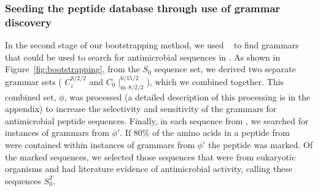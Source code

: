         \subsubsection{Seeding the peptide
            database through use of grammar
            discovery} In the second stage
            of our bootstrapping method,
            we used \Teiresias~ to find
            grammars that could be used
            to search for antimicrobial
            sequences in \sptr.  As shown in
            Figure~\ref{fig:bootstrapping},
            from the $S_0$ sequence
            set, we derived two separate
            grammar sets ( $C_i^{8/2/2}$ and
            $C_0\mid_{\textrm{m--}8/2/2}^{6/15/2}$),
            which we combined together.  This
            combined set, $\phi$, was processed
            (a detailed description of this
            processing is in the appendix)
            to increase the selectivity and
            sensitivity of the grammars for
            antimicrobial peptide sequences.
            Finally, in each sequence from
            \sptr, we searched for instances
            of grammars from $\phi'$.  If 80\%
            of the amino acids in a peptide
            from \sptr~ were contained within
            instances of grammars from $\phi'$
            the peptide was marked.  Of the
            marked sequences, we selected those
            sequences that were from eukaryotic
            organisms and had literature
            evidence of antimicrobial activity,
            calling these sequences $S_0^T$.


